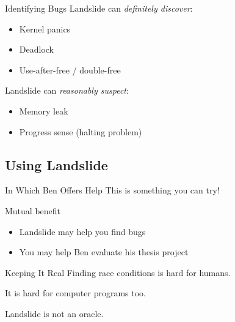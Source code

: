 \documentclass[xcolor=dvipsnames]{beamer}
\begin{document}
\begin{frame}{Identifying Bugs}
	Landslide can {\em definitely discover}:
	\begin{itemize}
		\item Kernel panics %
		\item Deadlock
		\item Use-after-free / double-free
	\end{itemize}
	Landslide can {\em reasonably suspect}:
	\begin{itemize}
		\item Memory leak
		\item Progress sense (halting problem)
	\end{itemize}
\end{frame}


\subsection{Using Landslide}


\begin{frame}{In Which Ben Offers Help}
	This is something you can try!
	\linegap

	Mutual benefit
	\begin{itemize}
		\item Landslide may help you find bugs
		\item You may help Ben evaluate his thesis project
	\end{itemize}
\end{frame}

\begin{frame}{Keeping It Real}
	Finding race conditions is hard for humans.

	\linegap
	It is hard for computer programs too.

	\linegap
	Landslide is not an oracle.
\end{frame}
\end{document}
